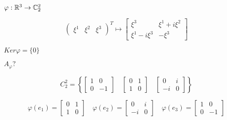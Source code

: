 \begin{example}
    $\varphi : \mathbb{R}^3 \to \mathbb{C}_2^2$

    $$\begin{pmatrix}
        \xi^1 & \xi^2 & \xi^3
    \end{pmatrix}^T \mapsto \begin{bmatrix}
        \xi^3 & \xi^1+i\xi^2 \\
        \xi^1 - i\xi^3 & -\xi^3
    \end{bmatrix}$$

    $Ker \varphi = \{0\}$

    $A_\varphi?$

    $$C_2^2 = \left\{
        \begin{bmatrix}
            1 & 0 \\
            0 & -1
        \end{bmatrix} \quad \begin{bmatrix}
            0 & 1 \\
            1 & 0
        \end{bmatrix} \quad \begin{bmatrix}
            0 & i \\
            -i & 0
        \end{bmatrix}    
    \right\}$$

    $$\varphi(e_1)=\begin{bmatrix}
        0 & 1 \\
        1 & 0
    \end{bmatrix} \quad \varphi(e_2) = \begin{bmatrix}
        0 & i \\
        -i & 0
    \end{bmatrix}\quad \varphi(e_3) = \begin{bmatrix}
        1 & 0 \\
        0 & -1
    \end{bmatrix}$$
\end{example}

